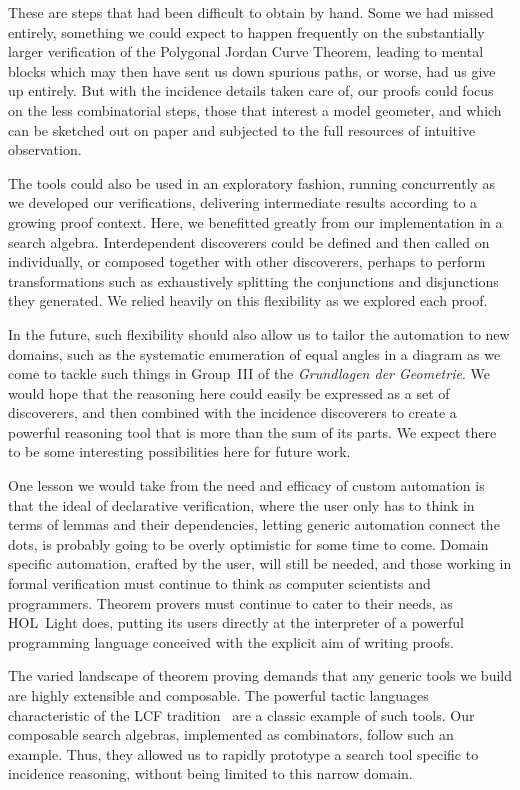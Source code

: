 These are steps that had been difficult to obtain by hand. Some we had missed entirely, something we could expect to happen frequently on the substantially larger verification of the Polygonal Jordan Curve Theorem, leading to mental blocks which may then have sent us down spurious paths, or worse, had us give up entirely. But with the incidence details taken care of, our proofs could focus on the less combinatorial steps, those that interest a model geometer, and which can be sketched out on paper and subjected to the full resources of intuitive observation.

The tools could also be used in an exploratory fashion, running concurrently as we developed our verifications, delivering intermediate results according to a growing proof context. Here, we benefitted greatly from our implementation in a search algebra. Interdependent discoverers could be defined and then called on individually, or composed together with other discoverers, perhaps to perform transformations such as exhaustively splitting the  conjunctions and disjunctions they generated. We relied heavily on this flexibility as we explored each proof.

In the future, such flexibility should also allow us to tailor the automation to new domains, such as the systematic enumeration of equal angles in a diagram as we come to tackle such things in Group~III of the \emph{Grundlagen der Geometrie}. We would hope that the reasoning here could easily be expressed as a set of discoverers, and then combined with the incidence discoverers to create a powerful reasoning tool that is more than the sum of its parts. We expect there to be some interesting possibilities here for future work.

One lesson we would take from the need and efficacy of custom automation is that the ideal of declarative verification, where the user only has to think in terms of lemmas and their dependencies, letting generic automation connect the dots, is probably going to be overly optimistic for some time to come. Domain specific automation, crafted by the user, will still be needed, and those working in formal verification must continue to think as computer scientists and programmers. Theorem provers must continue to cater to their needs, as HOL~Light does, putting its users directly at the interpreter of a powerful programming language conceived with the explicit aim of writing proofs.

The varied landscape of theorem proving demands that any generic tools we build are highly extensible and composable. The powerful tactic languages~\cite{Tactics} characteristic of the LCF tradition~\cite{LCF} are a classic example of such tools. Our composable search algebras, implemented as combinators, follow such an example. Thus, they allowed us to rapidly prototype a search tool specific to incidence reasoning, without being limited to this narrow domain.

